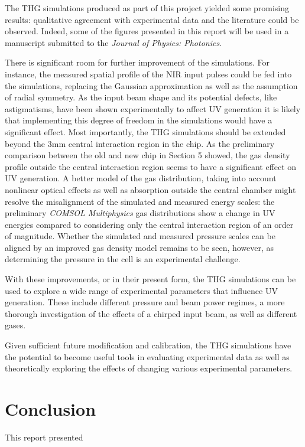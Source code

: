 \documentclass[a4paper]{jpconf}
\begin{document}
The THG simulations produced as part of this project yielded some promising results: qualitative agreement with experimental data and the literature could be observed. Indeed, some of the figures presented in this report will be used in a manuscript submitted to the \textit{Journal of Physics: Photonics}. \par 
There is significant room for further improvement of the simulations. For instance, the measured spatial profile of the NIR input pulses could be fed into the simulations, replacing the Gaussian approximation as well as the assumption of radial symmetry. As the input beam shape and its potential defects, like astigmatisms, have been shown experimentally to affect UV generation it is likely that implementing this degree of freedom in the simulations would have a significant effect. Most importantly, the THG simulations should be extended beyond the 3mm central interaction region in the chip. As the preliminary comparison between the old and new chip in Section 5 showed, the gas density profile outside the central interaction region seems to have a significant effect on UV generation.  A better model of the gas distribution, taking into account nonlinear optical effects as well as absorption outside the central chamber might resolve the misalignment of the simulated and measured energy scales: the preliminary \textit{COMSOL Multiphysics} gas distributions show a change in UV energies compared to considering only the central interaction region of an order of magnitude. Whether the simulated and measured pressure scales can be aligned by an improved gas density model remains to be seen, however, as determining the pressure in the cell is an experimental challenge. \par 
With these improvements, or in their present form, the THG simulations can be used to explore a wide range of experimental parameters that influence UV generation. These include different pressure and beam power regimes, a more thorough investigation of the effects of a chirped input beam, as well as different gases. \par 
Given sufficient future modification and calibration, the THG simulations have the potential to become useful tools in evaluating experimental data as well as theoretically exploring the effects of changing various experimental parameters.  

\section{Conclusion}
This report presented 
\end{document}
